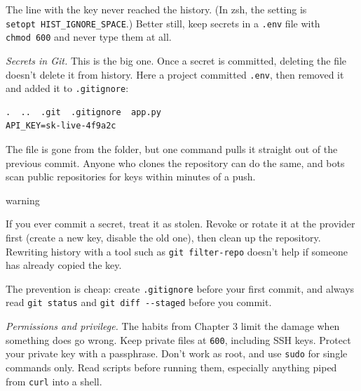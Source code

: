 The line with the key never reached the history. (In zsh, the setting is \texttt{setopt\ HIST\_}\allowbreak{}\texttt{IGNORE\_}\allowbreak{}\texttt{SPACE}.) Better still, keep secrets in a \texttt{.env} file with \texttt{chmod\ 600} and never type them at all.


\emph{Secrets in Git.} This is the big one. Once a secret is committed, deleting the file doesn't delete it from history. Here a project committed \texttt{.env}, then removed it and added it to \texttt{.gitignore}:

\begin{codeblock}

\begin{Shaded}
\begin{Highlighting}[]
 
\end{Highlighting}
\end{Shaded}

\end{codeblock}

\begin{codeblock}
\begin{Verbatim}[formatcom=\outputstyle]
.  ..  .git  .gitignore  app.py
API_KEY=sk-live-4f9a2c
\end{Verbatim}
\end{codeblock}

The file is gone from the folder, but one command pulls it straight out of the previous commit. Anyone who clones the repository can do the same, and bots scan public repositories for keys within minutes of a push.

\begin{callout}{warning}

If you ever commit a secret, treat it as stolen. Revoke or rotate it at the provider first (create a new key, disable the old one), then clean up the repository. Rewriting history with a tool such as \texttt{git\ filter-repo} doesn't help if someone has already copied the key.

\end{callout}

The prevention is cheap: create \texttt{.gitignore} before your first commit, and always read \texttt{git\ status} and \texttt{git\ diff\ -\/-staged} before you commit.

\emph{Permissions and privilege.} The habits from Chapter 3 limit the damage when something does go wrong. Keep private files at \texttt{600}, including SSH keys. Protect your private key with a passphrase. Don't work as root, and use \texttt{sudo} for single commands only. Read scripts before running them, especially anything piped from \texttt{curl} into a shell.

